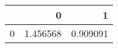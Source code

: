 \begin{tabular}{lrr}
\toprule
{} &         0 &         1 \\
\midrule
0 &  1.456568 &  0.909091 \\
\bottomrule
\end{tabular}
